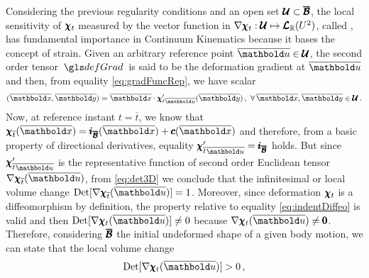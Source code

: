 Considering the previous regularity conditions and an open set $\pmb{\mathcal{U}}\subset\pmb{\overline{\mathcal{B}}}$, the local sensitivity of $\pmb{\chi}_t$ measured by the vector function in $\nabla\pmb{\chi}_t : \pmb{\mathcal{U}} \mapsto \pmb{\mathcal{L}}_{\mathbb{R}}(U^{2})$, called , has fundamental importance in Continuum Kinematics because it bases the concept of strain. Given an arbitrary reference point $\overline{\vto{u}}\in\pmb{\mathcal{U}}$, the second order tensor $\gloref{defGrad}$ is said to be the deformation gradient at $\overline{\vto{u}}$ and then, from equality \eqref{eq:gradFuncRep}, we have scalar
\begin{equation}
[\fua{\nabla\tnr{\chi}_t}{\overline{\vto{u}}}](\overline{\vto{x}},\overline{\vto{y}})=\overline{\vto{x}}\cdot\fua{{\tnr{\chi}'_t}_{\overline{\vto{u}}}}{\overline{\vto{y}}}\,,\,\,\forall\, \overline{\vto{x}},\overline{\vto{y}}\in\pmb{\mathcal{U}}\,.
\end{equation}
Now, at reference instant $t=\overline{t}$, we know that $\tnr{\chi}_{\overline{t}}(\overline{\vto{x}})=\tnr{i}_{\tnr{\overline{\mathcal{B}}}}(\overline{\vto{x}})+\fua{\vtf{c}}{\overline{\vto{x}}}$ and therefore, from a basic property of directional derivatives, equality ${\tnr{\chi}'_{\overline{t}} }_{\overline{\vto{u}}}=\tnr{i}_{\tnr{\overline{\mathcal{B}}}}$ holds. But since ${\tnr{\chi}'_{\overline{t}} }_{\overline{\vto{u}}}$ is the representative function of second order Euclidean tensor $\fua{\nabla\tnr{\chi}_{\overline{t}}}{\overline{\vto{u}}}$, from \eqref{eq:det3D} we conclude that the infinitesimal or local volume change $\textnormal{Det}[\fua{\nabla\tnr{\chi}_{\overline{t}}}{\overline{\vto{u}}}]=1$. Moreover, since deformation $\pmb{\chi}_{t}$ is a diffeomorphism by definition, the property relative to equality \eqref{eq:indentDiffeo} is valid and then $\textnormal{Det}[\fua{\nabla\tnr{\chi}_{t}}{\overline{\vto{u}}}]\neq 0$ because $\fua{\nabla\tnr{\chi}_{t}}{\overline{\vto{u}}}\neq \tnr{0}$. Therefore, considering $\pmb{\overline{\mathcal{B}}}$ the initial undeformed shape of a given body motion, we can state that the local volume change       
\begin{equation}\label{eq:detPositive}
\textnormal{Det}[\fua{\nabla\tnr{\chi}_t}{\overline{\vto{u}}}]>0\,,
\end{equation}
